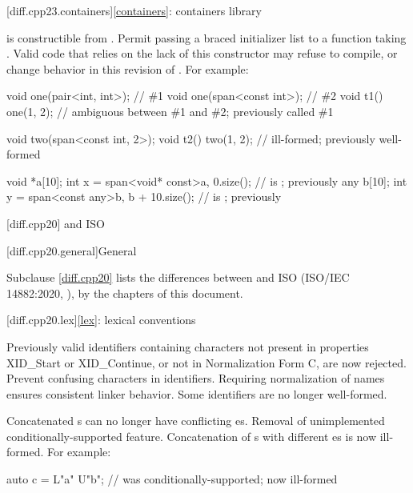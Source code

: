 [diff.cpp23.containers]{\ref{containers}: containers library}

\change
{} is constructible from .
\rationale
Permit passing a braced initializer list to a function taking .
\effect
Valid \CppXXIII{} code that relies on the lack of this constructor
may refuse to compile, or change behavior in this revision of \Cpp{}.
For example:
\begin{codeblock}
void one(pair<int, int>);       // \#1
void one(span<const int>);      // \#2
void t1() { one({1, 2}); }      // ambiguous between \#1 and \#2; previously called \#1

void two(span<const int, 2>);
void t2() { two({{1, 2}}); }    // ill-formed; previously well-formed

void *a[10];
int x = span<void* const>{a, 0}.size();     //  is ; previously 
any b[10];
int y = span<const any>{b, b + 10}.size();  //  is ; previously 
\end{codeblock}

[diff.cpp20]{\Cpp{} and ISO \CppXX{}}

[diff.cpp20.general]{General}

\pnum
{}%
Subclause \ref{diff.cpp20} lists the differences between \Cpp{} and
ISO \CppXX{} (ISO/IEC 14882:2020, ),
by the chapters of this document.

[diff.cpp20.lex]{\ref{lex}: lexical conventions}

\change
Previously valid identifiers containing characters
not present in  properties XID_Start or XID_Continue, or
not in Normalization Form C, are now rejected.
\rationale
Prevent confusing characters in identifiers.
Requiring normalization of names ensures consistent linker behavior.
\effect
Some identifiers are no longer well-formed.

\change
Concatenated s can no longer have
conflicting es.
\rationale
Removal of unimplemented conditionally-supported feature.
\effect
Concatenation of s
with different es
is now ill-formed.
For example:
\begin{codeblock}
auto c = L"a" U"b";             // was conditionally-supported; now ill-formed
\end{codeblock}

